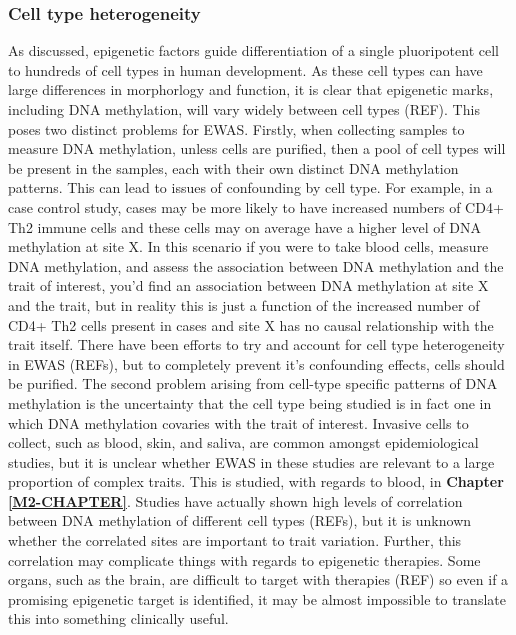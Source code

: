 \documentclass[11pt,twoside]{bristolthesis}
\begin{document}
\hypertarget{cell-type-heterogeneity}{%
\subsubsection{Cell type heterogeneity}\label{cell-type-heterogeneity}}

As discussed, epigenetic factors guide differentiation of a single pluoripotent cell to hundreds of cell types in human development. As these cell types can have large differences in morphorlogy and function, it is clear that epigenetic marks, including DNA methylation, will vary widely between cell types (REF). This poses two distinct problems for EWAS. Firstly, when collecting samples to measure DNA methylation, unless cells are purified, then a pool of cell types will be present in the samples, each with their own distinct DNA methylation patterns. This can lead to issues of confounding by cell type. For example, in a case control study, cases may be more likely to have increased numbers of CD4+ Th2 immune cells and these cells may on average have a higher level of DNA methylation at site X. In this scenario if you were to take blood cells, measure DNA methylation, and assess the association between DNA methylation and the trait of interest, you'd find an association between DNA methylation at site X and the trait, but in reality this is just a function of the increased number of CD4+ Th2 cells present in cases and site X has no causal relationship with the trait itself. There have been efforts to try and account for cell type heterogeneity in EWAS (REFs), but to completely prevent it's confounding effects, cells should be purified. The second problem arising from cell-type specific patterns of DNA methylation is the uncertainty that the cell type being studied is in fact one in which DNA methylation covaries with the trait of interest. Invasive cells to collect, such as blood, skin, and saliva, are common amongst epidemiological studies, but it is unclear whether EWAS in these studies are relevant to a large proportion of complex traits. This is studied, with regards to blood, in \textbf{Chapter \ref{M2-CHAPTER}}. Studies have actually shown high levels of correlation between DNA methylation of different cell types (REFs), but it is unknown whether the correlated sites are important to trait variation. Further, this correlation may complicate things with regards to epigenetic therapies. Some organs, such as the brain, are difficult to target with therapies (REF) so even if a promising epigenetic target is identified, it may be almost impossible to translate this into something clinically useful.
\end{document}
